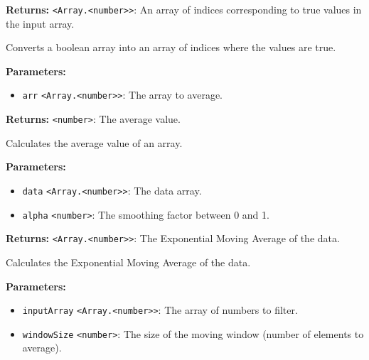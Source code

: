 \documentclass[12pt,a4paper]{article}
\begin{document}
\noindent \textbf{Returns:} \texttt{<Array.<number>>}: An array of indices corresponding to \textasciigrave{}true\textasciigrave{} values in the input array.

\noindent Converts a boolean array into an array of indices where the values are \textasciigrave{}true\textasciigrave{}.

\vspace{5mm}
\noindent {}


\noindent \textbf{Parameters:}
\begin{itemize}
  \item \texttt{arr} \texttt{<Array.<number>>}: The array to average.
\end{itemize}

\noindent \textbf{Returns:} \texttt{<number>}: The average value.

\noindent Calculates the average value of an array.

\vspace{5mm}
\noindent {}


\noindent \textbf{Parameters:}
\begin{itemize}
  \item \texttt{data} \texttt{<Array.<number>>}: The data array.
  \item \texttt{alpha} \texttt{<number>}: The smoothing factor between 0 and 1.
\end{itemize}

\noindent \textbf{Returns:} \texttt{<Array.<number>>}: The Exponential Moving Average of the data.

\noindent Calculates the Exponential Moving Average of the data.

\vspace{5mm}
\noindent {}


\noindent \textbf{Parameters:}
\begin{itemize}
  \item \texttt{inputArray} \texttt{<Array.<number>>}: The array of numbers to filter.
  \item \texttt{windowSize} \texttt{<number>}: The size of the moving window (number of elements to average).
\end{itemize}
\end{document}
